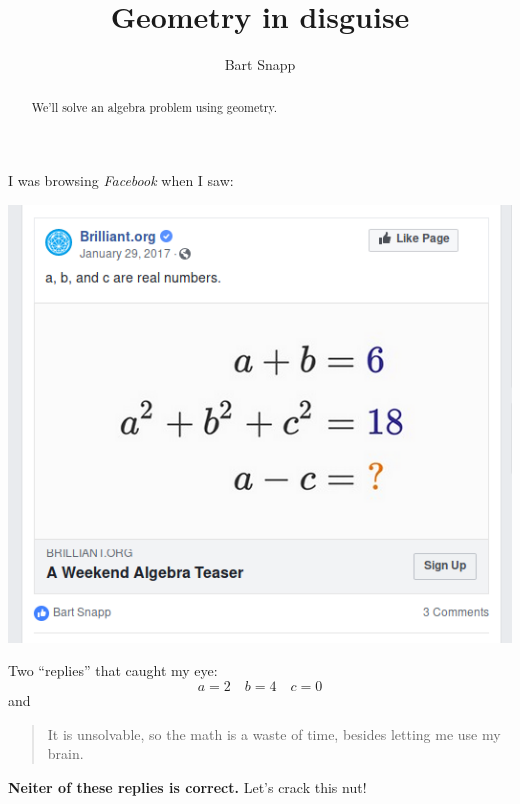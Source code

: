 \documentclass[noauthor,nooutcomes]{ximera}
\title{Geometry in disguise}
\author{Bart Snapp}
\begin{document}
\begin{abstract}
  We'll solve an algebra problem using geometry.
\end{abstract}
\maketitle

\begin{listOutcomes}
\item
\end{listOutcomes}

I was browsing \textsl{Facebook} when I saw:
\begin{center}
  \includegraphics[width=.6\textwidth]{fbQuestion.png}
\end{center}


Two ``replies'' that caught my eye:
\[
a = 2\quad b=4\quad c=0
\]
and
\begin{quote}
  It is unsolvable, so the math is a waste of time, besides letting
  me use my brain.
\end{quote}
\textbf{Neiter of these replies is correct.} Let's crack this nut!


\mynewpage
  
\end{document}
